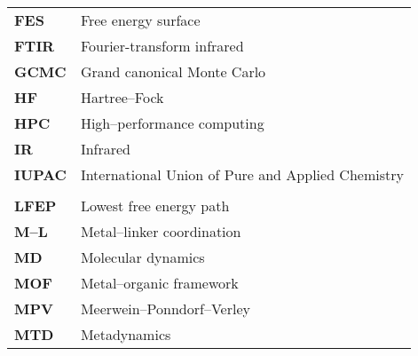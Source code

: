 \begin{longtable}{p{} p{}}
\textbf{FES} & Free energy surface \\
\textbf{FTIR} & Fourier-transform infrared \\
\textbf{GCMC} & Grand canonical Monte Carlo \\
\textbf{HF} & Hartree--Fock \\
\textbf{HPC} & High--performance computing \\ 
\textbf{IR} & Infrared\\
\textbf{IUPAC} &  International Union of Pure and Applied Chemistry \\
\\
\textbf{LFEP} & Lowest free energy path \\
\textbf{M--L} & Metal--linker coordination \\
\textbf{MD} & Molecular dynamics \\
\textbf{MOF} & Metal--organic framework \\
\textbf{MPV} & Meerwein--Ponndorf--Verley\\
\textbf{MTD} & Metadynamics \\

\end{longtable}
